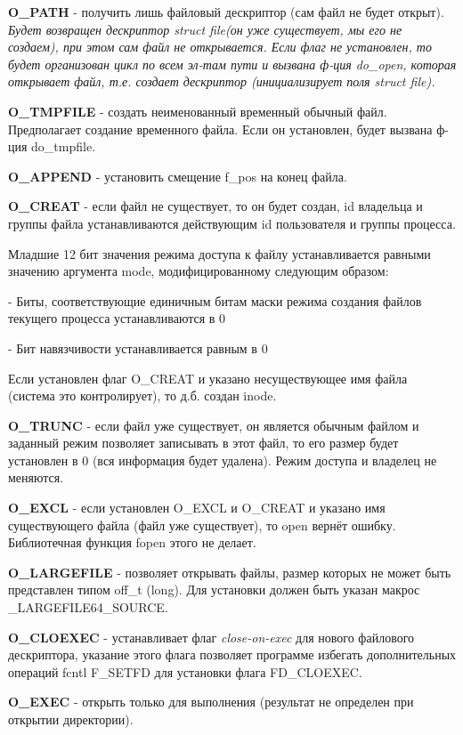 \textbf{O\_PATH} - получить лишь файловый дескриптор (сам файл не будет открыт). \textit{ Будет возвращен дескриптор struct file(он уже  существует, мы его не создаем), при этом сам файл не открывается. Если флаг не установлен, то будет организован цикл по всем эл-там пути и вызвана ф-ция do\_open, которая открывает файл, т.е. создает дескриптор (инициализирует поля struct file).}


\textbf{O\_TMPFILE} - создать неименованный временный обычный файл. Предполагает создание временного файла. Если он установлен, будет вызвана ф-ция do\_tmpfile.

\textbf{O\_APPEND} - установить смещение f\_pos на конец файла.


\textbf{O\_CREAT} - если файл не существует, то он будет создан, id владельца и группы файла устанавливаются действующим id пользователя и группы процесса.

Младшие 12 бит значения режима доступа к файлу устанавливается равными значению аргумента mode, модифицированному следующим образом:

- Биты, соответствующие единичным битам маски режима создания файлов текущего процесса устанавливаются в 0

- Бит навязчивости устанавливается равным в 0

Если установлен флаг O\_CREAT и указано несуществующее имя файла (система это контролирует), то д.б. создан inode.

\textbf{O\_TRUNC} - если файл уже существует, он является обычным файлом и заданный режим позволяет записывать в этот файл, то его размер будет установлен в 0 (вся информация будет удалена). Режим доступа и владелец не меняются.

\textbf{O\_EXCL }- если установлен O\_EXCL и O\_CREAT и указано имя существующего файла (файл уже существует), то open вернёт ошибку. Библиотечная функция fopen этого не делает.

\textbf{O\_LARGEFILE} - позволяет открывать файлы, размер которых не может
быть представлен типом off\_t (long). Для установки должен быть указан макрос 
\_LARGEFILE64\_SOURCE.

\textbf{O\_CLOEXEC} - устанавливает флаг \textit{close-on-exec} для нового файлового дескриптора, указание этого флага позволяет программе избегать дополнительных операций fcntl F\_SETFD для установки флага FD\_CLOEXEC.


\textbf{O\_EXEC} - открыть только для выполнения (результат не определен при открытии директории).

